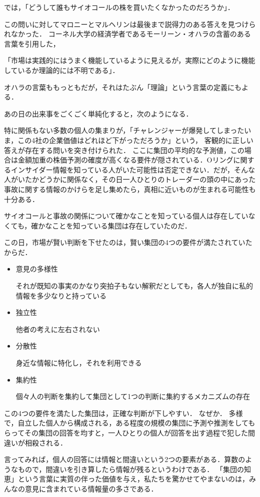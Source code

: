 では，「どうして誰もサイオコールの株を買いたくなかったのだろうか」．

この問いに対してマロニーとマルヘリンは最後まで説得力のある答えを見つけられなかった．
コーネル大学の経済学者であるモーリーン・オハラの含蓄のある言葉を引用した，

「市場は実践的にはうまく機能しているように見えるが，実際にどのように機能しているか理論的には不明である」．

オハラの言葉ももっともだが，それはたぶん「理論」という言葉の定義にもよる．

あの日の出来事をごくごく単純化すると，次のようになる．

特に関係もない多数の個人の集まりが，「チャレンジャーが爆発してしまったいま，この4社の企業価値はどれほど下がっただろうか」という，
客観的に正しい答えが存在する問いを突き付けられた．
ここに集団の平均的な予測値，この場合は金額加重の株価予測の確度が高くなる要件が隠されている．Oリングに関するインサイダー情報を知っている人がいた可能性は否定できない．だが，そんな人がいたかどうかに関係なく，その日一人ひとりのトレーダーの頭の中にあった事故に関する情報のかけらを足し集めたら，真相に近いものが生まれる可能性も十分ある．

サイオコールと事故の関係について確かなことを知っている個人は存在していなくても，確かなことを知っている集団は存在していたのだ．

この日，市場が賢い判断を下せたのは，賢い集団の4つの要件が満たされていたからだ．
\begin{itemize}
  \item 意見の多様性

それが既知の事実のかなり突拍子もない解釈だとしても，各人が独自に私的情報を多少なりと持っている
  \item 独立性

他者の考えに左右されない
  \item 分散性

身近な情報に特化し，それを利用できる
  \item 集約性  

個々人の判断を集約して集団として1つの判断に集約するメカニズムの存在
\end{itemize}


この4つの要件を満たした集団は，正確な判断が下しやすい．
なぜか．
多様で，自立した個人から構成される，ある程度の規模の集団に予測や推測をしてもらってその集団の回答を均すと，一人ひとりの個人が回答を出す過程で犯した間違いが相殺される．

言ってみれば，個人の回答には情報と間違いという2つの要素がある．算数のようなもので，間違いを引き算したら情報が残るというわけである．
「集団の知恵」という言葉に実質の伴った価値を与え，私たちを驚かせてやまないのは，みんなの意見に含まれている情報量の多さである．

